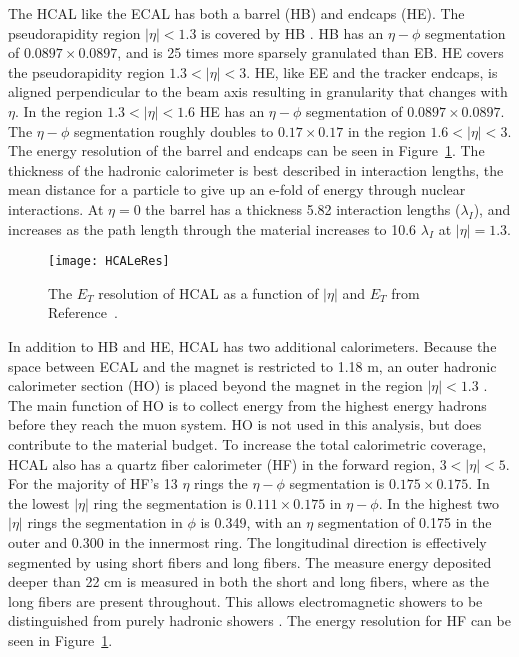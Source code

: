 The HCAL like the ECAL has both a barrel (HB) and endcaps (HE).
The pseudorapidity region $|\eta|<1.3$ is covered by HB \cite{tCmsE}. 
HB has an $\eta-\phi$ segmentation of $0.0897\times0.0897$, and is 25 times more
	sparsely granulated than EB.
HE covers the pseudorapidity region $1.3<|\eta|<3$.
HE, like EE and the tracker endcaps, is aligned perpendicular to the beam axis
	resulting in granularity that changes with $\eta$.
In the region $1.3 <|\eta|< 1.6$ HE has an $\eta-\phi$ segmentation of 
	$0.0897\times0.0897$.
The $\eta-\phi$ segmentation roughly doubles to $0.17\times0.17$ in the region
	$1.6 <|\eta|< 3$.
The energy resolution of the barrel and endcaps can be seen in  
	Figure~\ref{HCALeRes}.
The thickness of the hadronic calorimeter is best described in interaction
	lengths, the mean distance for a particle to give up an e-fold of energy
	through nuclear interactions. 
At $\eta = 0$ the barrel has a thickness 5.82 interaction lengths 
	($\lambda_{I}$), and increases as the path length through the material 
	increases to 10.6 $\lambda_{I}$ at $|\eta| = 1.3$.
\begin{figure}[h]
  \centering
    \texttt{[image: HCALeRes]}
  \caption{The $E_{T}$ resolution of HCAL as a function of $|\eta|$ and $E_{T}$
	from Reference~\cite{tCmsE}.}
  \label{HCALeRes}
\end{figure}

In addition to HB and HE, HCAL has two additional calorimeters.
Because the space between ECAL and the magnet is restricted to 1.18 m, an
	outer hadronic calorimeter section (HO) is placed beyond the magnet
	in the region $|\eta|<1.3$ \cite{tCmsE}.
The main function of HO is to collect energy from the highest energy hadrons
	before they reach the muon system.
HO is not used in this analysis, but does contribute to the material budget. 
To increase the total calorimetric coverage, HCAL also has a quartz fiber 
	calorimeter (HF) in the forward region, $3 < |\eta| < 5$.
For the majority of HF's 13 $\eta$ rings the $\eta-\phi$ segmentation is 
	$0.175\times0.175$.
In the lowest $|\eta|$ ring the segmentation is $0.111\times0.175$ in 
	$\eta-\phi$.
In the highest two $|\eta|$ rings the segmentation in $\phi$ is 0.349, with an
	$\eta$ segmentation of 0.175 in the outer and 0.300 in the innermost 
	ring. 
The longitudinal direction is effectively segmented by using short fibers and
	long fibers.
The measure energy deposited deeper than 22 cm is measured in both the short
	and long fibers, where as the long fibers are present throughout.
This allows electromagnetic showers to be distinguished from purely hadronic 
	showers \cite{tCmsE}.
The energy resolution for HF can be seen in Figure~\ref{HCALeRes}.  

